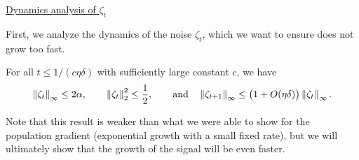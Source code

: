 \underline{Dynamics analysis of $\zeta_t$}

First, we analyze the dynamics of the noise $\zeta_t$, which we want to ensure does not grow too fast.

\begin{lemma} \label{lec14:lem:dynamics_noise}
    For all $t\leq 1 / (c\eta\delta)$ with sufficiently large constant $c$, we have
    \begin{equation} \label{lec14:eqn:dynamics_noise}
        \left\|\zeta_t\right\|_\infty \leq 2\alpha, \quad \quad \left\|\zeta_t\right\|_2^2 \leq \frac{1}{2}, \quad \quad \text{and} \quad \left\|\zeta_{t+1}\right\|_\infty \leq \big(1 + O(\eta\delta)\big) \left\|\zeta_t\right\|_\infty.
    \end{equation}
\end{lemma}
Note that this result is weaker than what we were able to show for the population gradient (exponential growth with a small fixed rate), but we will ultimately show that the growth of the signal will be even faster.

